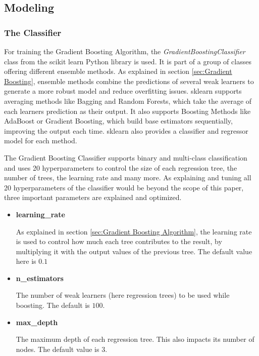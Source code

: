 \subsection{Modeling}

\subsubsection{The Classifier}

For training the Gradient Boosting Algorithm, the \emph{GradientBoostingClassifier} class from 
the scikit learn Python library is used. It is part of a group of classes offering different ensemble methods.
As explained in section \ref{sec:Gradient Boosting}, ensemble methods combine the predictions of several
weak learners to generate a more robust model and reduce overfitting issues.
sklearn supports averaging methods like Bagging and Random Forests, which take the average of each learners prediction
as their output. It also supports Boosting Methods like AdaBoost or Gradient Boosting, which
build base estimators sequentially, improving the output each time.
sklearn also provides a classifier and regressor model for each method.

The Gradient Boosting Classifier supports binary and multi-class classification and uses
20 hyperparameters to control the size of each regression tree, the number of trees,
the learning rate and many more.
As explaining and tuning all 20 hyperparameters of the classifier would be beyond the scope of this
paper, three important parameters are explained and optimized.

\begin{itemize}
    \item \textbf{learning\_rate}
    
    As explained in section \ref{sec:Gradient Boosting Algorithm}, the learning rate is used to control how
    much each tree contributes to the result, by multiplying it with the output values of the previous 
    tree. The default value here is $0.1$
    \item \textbf{n\_estimators}

    The number of weak learners (here regression trees) to be used while boosting. The default is $100$.
    \item \textbf{max\_depth}

    The maximum depth of each regression tree. This also impacts its number of nodes.
    The default value is $3$.
\end{itemize}

